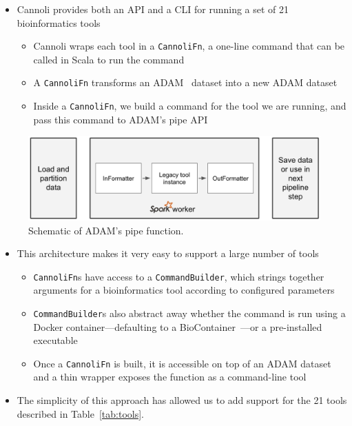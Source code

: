 \documentclass{bioinfo}
\begin{document}
\begin{itemize}
\item Cannoli provides both an API and a CLI for running a set of 21 bioinformatics tools
  \begin{itemize}
  \item Cannoli wraps each tool in a \texttt{CannoliFn}, a one-line command that
    can be called in Scala to run the command
  \item A \texttt{CannoliFn} transforms an ADAM~\citep{massie13, nothaft15} dataset
    into a new ADAM dataset
  \item Inside a \texttt{CannoliFn}, we build a command for the tool we are running,
    and pass this command to ADAM's pipe API
  \end{itemize}
\end{itemize}

\begin{figure}[!tpb]
\centerline{\includegraphics[width=0.95\linewidth]{pipe.png}}
\caption{Schematic of ADAM's pipe function.}\label{fig:pipe}
\end{figure}

\begin{itemize}
\item This architecture makes it very easy to support a large number of tools
  \begin{itemize}
  \item \texttt{CannoliFn}s have access to a \texttt{CommandBuilder}, which strings
    together arguments for a bioinformatics tool according to configured parameters
  \item \texttt{CommandBuilder}s also abstract away whether the command is run using
    a Docker container---defaulting to a BioContainer~\citep{daveiga17}---or a
    pre-installed executable
  \item Once a \texttt{CannoliFn} is built, it is accessible on top of an ADAM dataset
    and a thin wrapper exposes the function as a command-line tool
  \end{itemize}
\item The simplicity of this approach has allowed us to add support for the 21 tools
  described in Table~\ref{tab:tools}.
\end{itemize}
\end{document}
